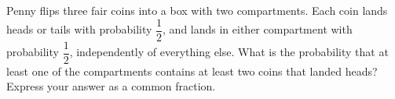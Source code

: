 Penny flips three fair coins into a box with two compartments. Each coin lands heads or tails with probability $\dfrac{1}{2}$, and lands in either compartment with probability $\dfrac{1}{2}$, independently of everything else. What is the probability that at least one of the compartments contains at least two coins that landed heads? Express your answer as a common fraction.
